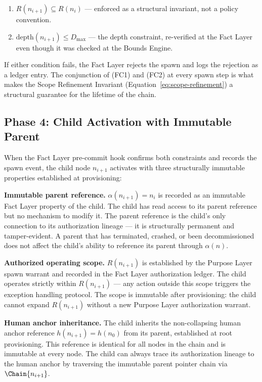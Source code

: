 \begin{enumerate}
    \item[(FC1)] $R(n_{i+1}) \subseteq R(n_i)$ — enforced as a structural invariant, not a policy convention.
    \item[(FC2)] $\text{depth}(n_{i+1}) \leq D_{\max}$ — the depth constraint, re-verified at the Fact Layer even though it was checked at the Bounds Engine.
\end{enumerate}

If either condition fails, the Fact Layer rejects the spawn and logs the rejection as a ledger entry. The conjunction of (FC1) and (FC2) at every spawn step is what makes the Scope Refinement Invariant (Equation~\ref{eq:scope-refinement}) a structural guarantee for the lifetime of the chain.

\subsection{Phase 4: Child Activation with Immutable Parent}
\label{sec:rs-child-activation}

When the Fact Layer pre-commit hook confirms both constraints and records the spawn event, the child node $n_{i+1}$ activates with three structurally immutable properties established at provisioning:

\medskip
\noindent\textbf{Immutable parent reference.} $\alpha(n_{i+1}) = n_i$ is recorded as an immutable Fact Layer property of the child. The child has read access to its parent reference but no mechanism to modify it. The parent reference is the child's only connection to its authorization lineage — it is structurally permanent and tamper-evident. A parent that has terminated, crashed, or been decommissioned does not affect the child's ability to reference its parent through $\alpha(n)$.

\medskip
\noindent\textbf{Authorized operating scope.} $R(n_{i+1})$ is established by the Purpose Layer spawn warrant and recorded in the Fact Layer authorization ledger. The child operates strictly within $R(n_{i+1})$ — any action outside this scope triggers the exception handling protocol. The scope is immutable after provisioning: the child cannot expand $R(n_{i+1})$ without a new Purpose Layer authorization warrant.

\medskip
\noindent\textbf{Human anchor inheritance.} The child inherits the non-collapsing human anchor reference $h(n_{i+1}) = h(n_0)$ from its parent, established at root provisioning. This reference is identical for all nodes in the chain and is immutable at every node. The child can always trace its authorization lineage to the human anchor by traversing the immutable parent pointer chain via $\Chain{n_{i+1}}$.

